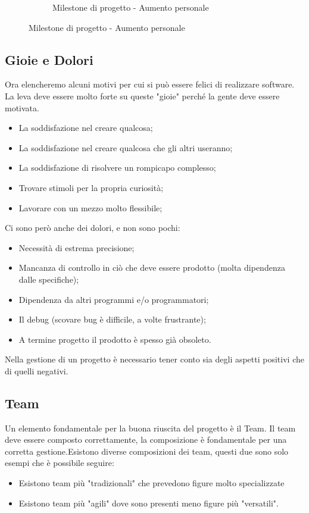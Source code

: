 \begin{figure}[H]
\begin{subfigure}{.32 \textwidth}
		\caption{Milestone di progetto - Aumento personale}
	\end{subfigure}%
\end{figure}
\subsection{Gioie e Dolori}
Ora elencheremo alcuni motivi per cui si può essere felici di realizzare software. La leva deve essere molto forte su queste "gioie" perché la gente deve essere motivata.
\begin{itemize}
	\item La soddisfazione nel creare qualcosa;
	\item La soddisfazione nel creare qualcosa che gli altri useranno;
	\item La soddisfazione di risolvere un rompicapo complesso;
	\item Trovare stimoli per la propria curiosità;
	\item Lavorare con un mezzo molto flessibile;
\end{itemize}
Ci sono però anche dei dolori, e non sono pochi:
\begin{itemize}
	\item Necessità di estrema precisione;
	\item Mancanza di controllo in ciò che deve essere prodotto (molta dipendenza dalle specifiche);
	\item Dipendenza da altri programmi e/o programmatori;
	\item Il debug (scovare bug è difficile, a volte frustrante);
	\item A termine progetto il prodotto è spesso già obsoleto.
\end{itemize}
Nella gestione di un progetto è necessario tener conto sia degli aspetti positivi che di quelli negativi.
\subsection{Team}
Un elemento fondamentale per la buona riuscita del progetto è il Team. Il team deve essere composto correttamente, la composizione è fondamentale per una corretta gestione.Esistono diverse composizioni dei team, questi due sono solo esempi che è possibile seguire:
\begin{itemize}
	\item Esistono team più "tradizionali" che prevedono figure molto specializzate
	\item Esistono team più "agili" dove sono presenti meno figure più "versatili".
\end{itemize}
